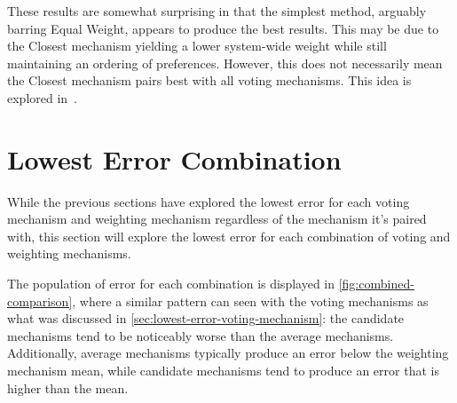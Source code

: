 These results are somewhat surprising in that the simplest method, arguably barring
Equal Weight, appears to produce the best results.
This may be due to the Closest mechanism yielding a lower system-wide weight while
still maintaining an ordering of preferences.
However, this does not necessarily mean the Closest mechanism pairs best with all
voting mechanisms.
This idea is explored in~.


\section{Lowest Error Combination}\label{sec:lowest-error-overall-combination}
While the previous sections have explored the lowest error for each voting mechanism and
weighting mechanism regardless of the mechanism it's paired with, this section will
explore the lowest error for each combination of voting and weighting mechanisms.

The population of error for each combination is displayed in
\autoref{fig:combined-comparison}, where a similar pattern can seen with the voting
mechanisms as what was discussed in \autoref{sec:lowest-error-voting-mechanism}: the
candidate mechanisms tend to be noticeably worse than the average mechanisms.
Additionally, average mechanisms typically produce an error below the weighting
mechanism mean, while candidate mechanisms tend to produce an error that is higher
than the mean.

